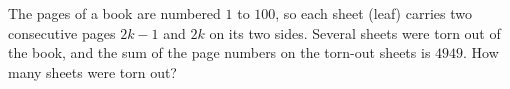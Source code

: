 The pages of a book are numbered $1$ to $100$, so each sheet (leaf) carries two consecutive pages $2k-1$ and $2k$ on its two sides. Several sheets were torn out of the book, and the sum of the page numbers on the torn-out sheets is $4949$. How many sheets were torn out?
